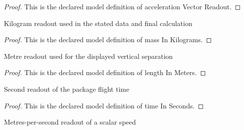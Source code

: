 \begin{proof}
  This is the declared model definition of acceleration Vector Readout.
\end{proof}
\begin{definition}
  \label{def:physics:phyx-mini-0768:phyxminiproblems-problemphyxmini0768-massinkilograms}
  Kilogram readout used in the stated data and final calculation
\end{definition}
\begin{proof}
  This is the declared model definition of mass In Kilograms.
\end{proof}
\begin{definition}
  \label{def:physics:phyx-mini-0768:phyxminiproblems-problemphyxmini0768-lengthinmeters}
  Metre readout used for the displayed vertical separation
\end{definition}
\begin{proof}
  This is the declared model definition of length In Meters.
\end{proof}
\begin{definition}
  \label{def:physics:phyx-mini-0768:phyxminiproblems-problemphyxmini0768-timeinseconds}
  Second readout of the package flight time
\end{definition}
\begin{proof}
  This is the declared model definition of time In Seconds.
\end{proof}
\begin{definition}
  \label{def:physics:phyx-mini-0768:phyxminiproblems-problemphyxmini0768-speedinmeterspersecond}
  Metres-per-second readout of a scalar speed
\end{definition}
